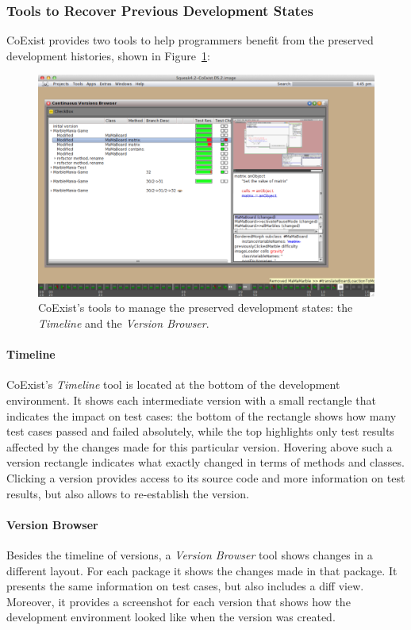 \subsubsection{Tools to Recover Previous Development States}

CoExist provides two tools to help programmers benefit from the preserved development histories, shown in Figure~\ref{fig:CoExist}:

\begin{figure}[h]
    \centering
    \includegraphics[width=\textwidth]{figures/2_background/4_coexistTools.pdf}
    \caption{CoExist's tools to manage the preserved development states: the \emph{Timeline} and the \emph{Version Browser}.}
    \label{fig:CoExist}
\end{figure}

\paragraph{Timeline}
CoExist's \emph{Timeline} tool is located at the bottom of the development environment.
It shows each intermediate version with a small rectangle that indicates the impact on test cases: the bottom of the rectangle shows how many test cases passed and failed absolutely, while the top highlights only test results affected by the changes made for this particular version.
Hovering above such a version rectangle indicates what exactly changed in terms of methods and classes.
Clicking a version provides access to its source code and more information on test results, but also allows to re-establish the version.

\paragraph{Version Browser}
Besides the timeline of versions, a \emph{Version Browser} tool shows changes in a different layout.
For each package it shows the changes made in that package.
It presents the same information on test cases, but also includes a diff view.
Moreover, it provides a screenshot for each version that shows how the development environment looked like when the version was created.

